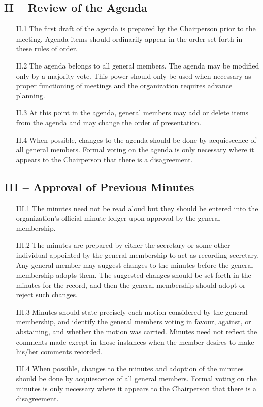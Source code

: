 \documentclass[12pt,a4paper]{article}
\begin{document}
\subsection*{II – Review of the Agenda}

\begin{enumerate}
\item[II.1] The first draft of the agenda is prepared by the Chairperson prior to the meeting. Agenda items should ordinarily appear in the order set forth in these rules of order.

\item[II.2] The agenda belongs to all general members. The agenda may be modified only by a majority vote. This power should only be used when necessary as proper functioning of meetings and the organization requires advance planning.

\item[II.3] At this point in the agenda, general members may add or delete items from the agenda and may change the order of presentation.

\item[II.4] When possible, changes to the agenda should be done by acquiescence of all general members. Formal voting on the agenda is only necessary where it appears to the Chairperson that there is a disagreement.
\end{enumerate}

\subsection*{III – Approval of Previous Minutes}

\begin{enumerate}
\item[III.1] The minutes need not be read aloud but they should be entered into the organization's official minute ledger upon approval by the general membership.

\item[III.2] The minutes are prepared by either the secretary or some other individual appointed by the general membership to act as recording secretary. Any general member may suggest changes to the minutes before the general membership adopts them. The suggested changes should be set forth in the minutes for the record, and then the general membership should adopt or reject such changes.

\item[III.3] Minutes should state precisely each motion considered by the general membership, and identify the general members voting in favour, against, or abstaining, and whether the motion was carried. Minutes need not reflect the comments made except in those instances when the member desires to make his/her comments recorded.

\item[III.4] When possible, changes to the minutes and adoption of the minutes should be done by acquiescence of all general members. Formal voting on the minutes is only necessary where it appears to the Chairperson that there is a disagreement.
\end{enumerate}
\end{document}
